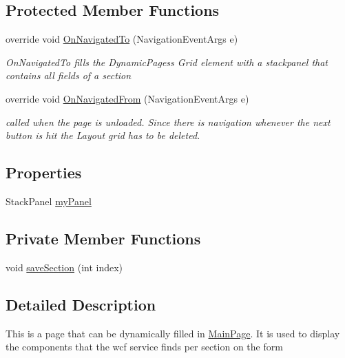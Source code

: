 \subsection*{Protected Member Functions}
\begin{DoxyCompactItemize}
\item 
override void \mbox{\hyperlink{class_listen_to_me_1_1_dynamic_page_abe7cf843906f8a930d2bdd2ade17ea0b}{On\+Navigated\+To}} (Navigation\+Event\+Args e)
\begin{DoxyCompactList}\small\item\em On\+Navigated\+To fills the Dynamic\+Pages\textquotesingle{}s Grid element with a stackpanel that contains all fields of a section \end{DoxyCompactList}\item 
override void \mbox{\hyperlink{class_listen_to_me_1_1_dynamic_page_a042e3936e2668147cd280d2428ef793b}{On\+Navigated\+From}} (Navigation\+Event\+Args e)
\begin{DoxyCompactList}\small\item\em called when the page is unloaded. Since there is navigation whenever the \textquotesingle{}next\textquotesingle{} button is hit the Layout grid has to be deleted. \end{DoxyCompactList}\end{DoxyCompactItemize}
\subsection*{Properties}
\begin{DoxyCompactItemize}
\item 
Stack\+Panel \mbox{\hyperlink{class_listen_to_me_1_1_dynamic_page_a187c4aba2636c3956cf023f1dc3f86ec}{my\+Panel}}
\end{DoxyCompactItemize}
\subsection*{Private Member Functions}
\begin{DoxyCompactItemize}
\item 
void \mbox{\hyperlink{class_listen_to_me_1_1_dynamic_page_ab3716b91cf48530310b3cd6ce47506a3}{save\+Section}} (int index)
\end{DoxyCompactItemize}


\subsection{Detailed Description}
This is a page that can be dynamically filled in \mbox{\hyperlink{class_listen_to_me_1_1_main_page}{Main\+Page}}. It is used to display the components that the wcf service finds per section on the form 



